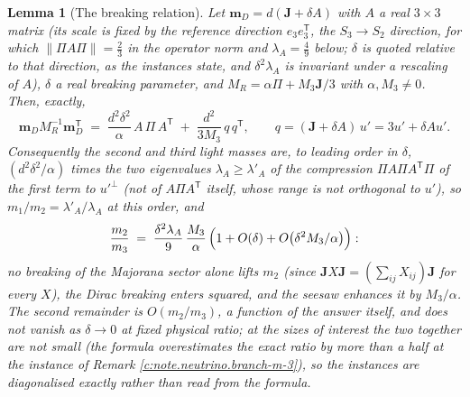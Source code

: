 \documentclass[11pt]{article}
\newtheorem{lemma}[theorem]{Lemma}
\theoremstyle{definition}
\theoremstyle{plain}
\providecommand{\J}{}\renewcommand{\J}{\mathbf{J}}
\providecommand{\mD}{}\renewcommand{\mD}{\mathbf{m}_{D}}
\begin{document}
\begin{lemma}[The breaking relation]\label{c:neutrino.breaking-relation}
Let $\mD = d(\J + \delta A)$ with $A$ a real $3 \times 3$ matrix (its scale is fixed by the reference direction $e_{3}e_{3}^{\mathsf{T}}$, the $S_{3} \to S_{2}$ direction, for which $\|\Pi A\Pi\| = \tfrac23$ in the operator norm and $\lambda_{A} = \tfrac49$ below; $\delta$ is quoted relative to that direction, as the instances state, and $\delta^{2}\lambda_{A}$ is invariant under a rescaling of $A$), $\delta$ a real breaking parameter, and $M_{R} = \alpha\Pi + M_{3}\J/3$ with $\alpha, M_{3} \neq 0$. Then, exactly,
\[
\mD M_{R}^{-1}\mD^{\mathsf{T}} \;=\; \frac{d^{2}\delta^{2}}{\alpha}\,A\,\Pi\,A^{\mathsf{T}} \;+\; \frac{d^{2}}{3M_{3}}\,q\,q^{\mathsf{T}}, \qquad q = (\J + \delta A)\,u' = 3u' + \delta A u' .
\]
Consequently the second and third light masses are, to leading order in $\delta$, $(d^{2}\delta^{2}/\alpha)$ times the two eigenvalues $\lambda_{A} \ge \lambda'_{A}$ of the compression $\Pi A\Pi A^{\mathsf{T}}\Pi$ of the first term to $u'^{\perp}$ (not of $A\Pi A^{\mathsf{T}}$ itself, whose range is not orthogonal to $u'$), so $m_{1}/m_{2} = \lambda'_{A}/\lambda_{A}$ at this order, and
\[
\frac{m_{2}}{m_{3}} \;=\; \frac{\delta^{2}\lambda_{A}}{9}\,\frac{M_{3}}{\alpha}\,\Bigl(1 + O(\delta) + O\bigl(\delta^{2}M_{3}/\alpha\bigr)\Bigr):
\]
no breaking of the Majorana sector alone lifts $m_{2}$ (since $\J X \J = (\textstyle\sum_{ij}X_{ij})\J$ for every $X$), the Dirac breaking enters squared, and the seesaw enhances it by $M_{3}/\alpha$. The second remainder is $O(m_{2}/m_{3})$, a function of the answer itself, and does not vanish as $\delta \to 0$ at fixed physical ratio; at the sizes of interest the two together are not small (the formula overestimates the exact ratio by more than a half at the instance of Remark \ref{c:note.neutrino.branch-m-3}), so the instances are diagonalised exactly rather than read from the formula.
\end{lemma}
\end{document}
